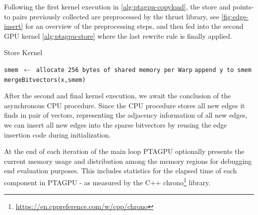 Following the first kernel execution in \autoref{alg:ptagpu-copyload}, the store and points-to pairs previously collected are preprocessed by the thrust library, see \autoref{fig:edge-insert} for an overview of the preprocessing steps, and then fed into the second GPU kernel \autoref{alg:ptagpu-store} where the last rewrite rule is finally applied.
\begin{algorithm}
    \caption[Store Kernel Pseudocode]{Store Kernel}\label{alg:ptagpu-store}
    \begin{algorithmic}
        \State \texttt{smem $\leftarrow$ allocate 256 bytes of shared memory per Warp}
        \State \texttt{append y to smem}
        \EndFor
        \State \texttt{mergeBitvectors(x,smem)} 
        \EndFor
    \end{algorithmic}
\end{algorithm}

After the second and final kernel execution, we await the conclusion of the asynchronous CPU procedure.
Since the CPU procedure stores all new edges it finds in pair of vectors, representing the adjacency information of all new edges, we can insert all new edges into the sparse bitvectors by reusing the edge insertion code during initialization.

At the end of each iteration of the main loop PTAGPU optionally presents the current memory usage and distribution among the memory regions for debugging end evaluation purposes. This includes statistics for the elapsed time of each component in PTAGPU - as measured by the C++ chrono\footnote{\url{https://en.cppreference.com/w/cpp/chrono}} library.

